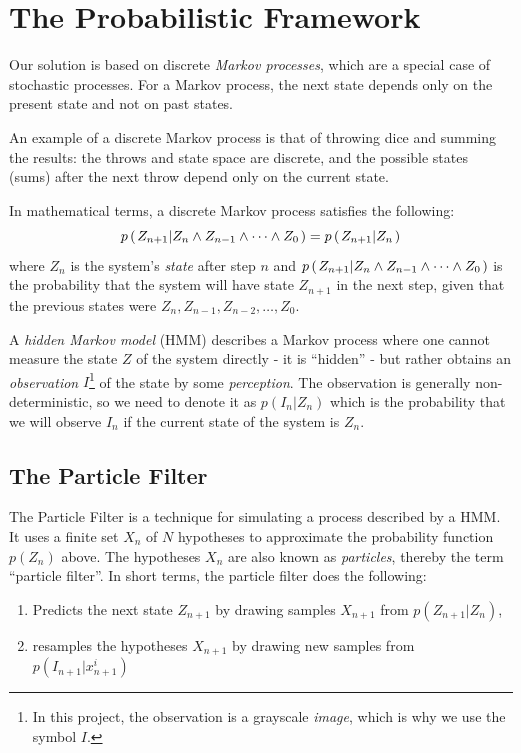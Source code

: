 \section*{The Probabilistic Framework}
Our solution is based on discrete \emph{Markov processes}, which are a special case of stochastic processes. For a Markov process, the next state depends only on the present state and not on past states.

An example of a discrete Markov process is that of throwing dice and summing the results: the throws and state space are discrete, and the possible states (sums) after the next throw depend only on the current state.

In mathematical terms, a discrete Markov process satisfies the following:
\begin{equation}
 p\left(\left. Z_{n+1} \middle\vert Z_n \wedge Z_{n-1} \wedge \dots \wedge Z_0 \right.\right) = p\left(\left. Z_{n+1} \middle\vert Z_n \right.\right)
\end{equation}
where $Z_n$ is the system's \emph{state} after step $n$ and $p\left(\left. Z_{n+1} \middle\vert Z_n \wedge Z_{n-1} \wedge \dots \wedge Z_0 \right.\right)$ is the probability that the system will have state $Z_{n+1}$ in the next step, given that the previous states were $Z_n, Z_{n-1}, Z_{n-2}, \dots, Z_0$.

A \emph{hidden Markov model} (HMM) describes a Markov process where one cannot measure the state $Z$ of the system directly - it is ``hidden'' - but rather obtains an \emph{observation} $I$\footnote{In this project, the observation is a grayscale \emph{image}, which is why we use the symbol $I$.}  of the state by some \emph{perception}. The observation is generally non-deterministic, so we need to denote it as $p(I_n|Z_n)$ which is the probability that we will observe $I_n$ if the current state of the system is $Z_n$.

\subsection*{The Particle Filter}
The Particle Filter is a technique for simulating a process described by a HMM. It uses a finite set $X_n$ of $N$ hypotheses to approximate the probability function $p(Z_n)$ above. The hypotheses $X_n$ are also known as \emph{particles}, thereby the term ``particle filter''. In short terms, the particle filter does the following:

\begin{enumerate}
  \item Predicts the next state $Z_{n+1}$ by drawing samples $X_{n+1}$ from $p(Z_{n+1} | Z_n)$,
  \item resamples the hypotheses $X_{n+1}$ by drawing new samples from $p\left(I_{n+1} | x_{n+1}^i\right)$
\end{enumerate}


